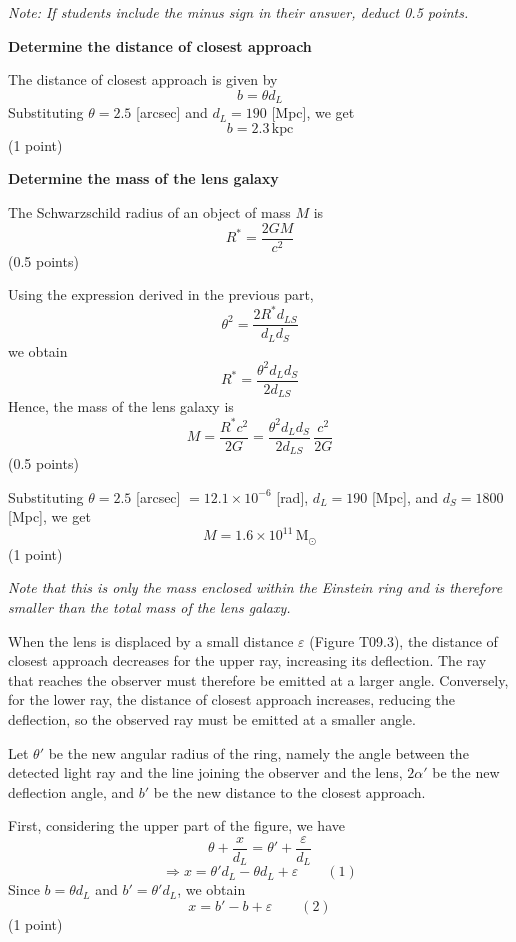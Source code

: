 \begin{description}
  \textit{Note: If students include the minus sign in their answer, deduct
  0.5 points.}

\item[(c)] \textbf{Determine the distance of closest approach}

  The distance of closest approach is given by
  \[ b = \theta d_L \]
  Substituting $\theta = 2.5$ [arcsec] and $d_L = 190$ [Mpc], we get
  \[ b = 2.3\,\mathrm{kpc} \]
  \hfill(1 point)

  \textbf{Determine the mass of the lens galaxy}

  The Schwarzschild radius of an object of mass $M$ is
  \[ R^* = \frac{2GM}{c^2} \]
  \hfill(0.5 points)

  Using the expression derived in the previous part,
  \[ \theta^2 = \frac{2R^* d_{LS}}{d_L d_S} \]
  we obtain
  \[ R^* = \frac{\theta^2 d_L d_S}{2 d_{LS}} \]
  Hence, the mass of the lens galaxy is
  \[ M = \frac{R^* c^2}{2G} = \frac{\theta^2 d_L d_S}{2 d_{LS}}\,\frac{c^2}{2G} \]
  \hfill(0.5 points)

  Substituting $\theta = 2.5$ [arcsec] $= 12.1 \times 10^{-6}$ [rad],
  $d_L = 190$ [Mpc], and $d_S = 1800$ [Mpc], we get
  \[ M = 1.6 \times 10^{11}\,\mathrm{M}_\odot \]
  \hfill(1 point)

  \textit{Note that this is only the mass enclosed within the Einstein ring
  and is therefore smaller than the total mass of the lens galaxy.}

\item[(d)] When the lens is displaced by a small distance $\varepsilon$
  (Figure T09.3), the distance of closest approach decreases for the upper
  ray, increasing its deflection. The ray that reaches the observer must
  therefore be emitted at a larger angle. Conversely, for the lower ray, the
  distance of closest approach increases, reducing the deflection, so the
  observed ray must be emitted at a smaller angle.

  Let $\theta'$ be the new angular radius of the ring, namely the angle
  between the detected light ray and the line joining the observer and the
  lens, $2\alpha'$ be the new deflection angle, and $b'$ be the new distance
  to the closest approach.

  First, considering the upper part of the figure, we have
  \[ \theta + \frac{x}{d_L} = \theta' + \frac{\varepsilon}{d_L} \]
  \[ \Rightarrow x = \theta' d_L - \theta d_L + \varepsilon \qquad (1) \]
  Since $b = \theta d_L$ and $b' = \theta' d_L$, we obtain
  \[ x = b' - b + \varepsilon \qquad (2) \]
  \hfill(1 point)


\end{description}
